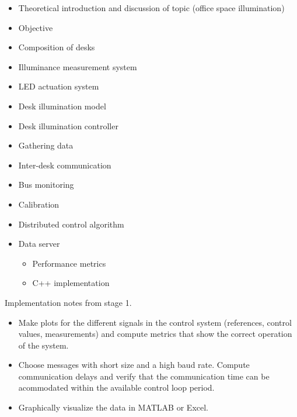 \documentclass[english,fira]{ist-report}
\begin{document}
\begin{itemize}
	\item Theoretical introduction and discussion of topic (office space illumination)
	\item Objective
	\item Composition of desks
	\item Illuminance measurement system
	\item LED actuation system
	\item Desk illumination model
	\item Desk illumination controller
	\item Gathering data
	\item Inter-desk communication
	\item Bus monitoring
	\item Calibration
	\item Distributed control algorithm
	\item Data server
	\begin{itemize}
		\item Performance metrics
		\item C++ implementation
	\end{itemize}
\end{itemize}

Implementation notes from stage 1.
\begin{itemize}
	\item Make plots for the different signals in the control system (references, control values, measurements) and compute metrics that show the correct operation of the system.
	\item Choose messages with short size and a high baud rate. Compute communication delays and verify that the communication time can be acommodated within the available control loop period.
	\item Graphically visualize the data in MATLAB or Excel.
\end{itemize}
\end{document}
